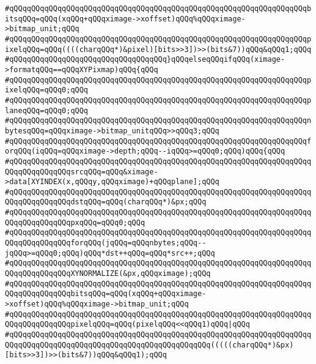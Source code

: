 \verb|#qQQqqQQqqQQqqQQqqQQqqQQqqQQqqQQqqQQqqQQqqQQqqQQqqQQqqQQqqQQqqQQqqQQqbitsqQQq=qQQq(xqQQq+qQQqximage->xoffset)qQQq%qQQqximage->bitmap_unit;qQQq|\newline
\verb|#qQQqqQQqqQQqqQQqqQQqqQQqqQQqqQQqqQQqqQQqqQQqqQQqqQQqqQQqqQQqqQQqqQQqpixelqQQq=qQQq((((charqQQq*)&pixel)[bits>>3])>>(bits&7))qQQq&qQQq1;qQQq|\newline
\verb|#qQQqqQQqqQQqqQQqqQQqqQQqqQQqqQQqqQQq}qQQqelseqQQqifqQQq(ximage->formatqQQq==qQQqXYPixmap)qQQq{qQQq|\newline
\verb|#qQQqqQQqqQQqqQQqqQQqqQQqqQQqqQQqqQQqqQQqqQQqqQQqqQQqqQQqqQQqqQQqqQQqpixelqQQq=qQQq0;qQQq|\newline
\verb|#qQQqqQQqqQQqqQQqqQQqqQQqqQQqqQQqqQQqqQQqqQQqqQQqqQQqqQQqqQQqqQQqqQQqplaneqQQq=qQQq0;qQQq|\newline
\verb|#qQQqqQQqqQQqqQQqqQQqqQQqqQQqqQQqqQQqqQQqqQQqqQQqqQQqqQQqqQQqqQQqqQQqnbytesqQQq=qQQqximage->bitmap_unitqQQq>>qQQq3;qQQq|\newline
\verb|#qQQqqQQqqQQqqQQqqQQqqQQqqQQqqQQqqQQqqQQqqQQqqQQqqQQqqQQqqQQqqQQqqQQqforqQQq(iqQQq=qQQqximage->depth;qQQq--iqQQq>=qQQq0;qQQq)qQQq{qQQq|\newline
\verb|#qQQqqQQqqQQqqQQqqQQqqQQqqQQqqQQqqQQqqQQqqQQqqQQqqQQqqQQqqQQqqQQqqQQqqQQqqQQqqQQqqQQqsrcqQQq=qQQq&ximage->data[XYINDEX(x,qQQqy,qQQqximage)+qQQqplane];qQQq|\newline
\verb|#qQQqqQQqqQQqqQQqqQQqqQQqqQQqqQQqqQQqqQQqqQQqqQQqqQQqqQQqqQQqqQQqqQQqqQQqqQQqqQQqqQQqdstqQQq=qQQq(charqQQq*)&px;qQQq|\newline
\verb|#qQQqqQQqqQQqqQQqqQQqqQQqqQQqqQQqqQQqqQQqqQQqqQQqqQQqqQQqqQQqqQQqqQQqqQQqqQQqqQQqqQQqpxqQQq=qQQq0;qQQq|\newline
\verb|#qQQqqQQqqQQqqQQqqQQqqQQqqQQqqQQqqQQqqQQqqQQqqQQqqQQqqQQqqQQqqQQqqQQqqQQqqQQqqQQqqQQqforqQQq(jqQQq=qQQqnbytes;qQQq--jqQQq>=qQQq0;qQQq)qQQq*dst++qQQq=qQQq*src++;qQQq|\newline
\verb|#qQQqqQQqqQQqqQQqqQQqqQQqqQQqqQQqqQQqqQQqqQQqqQQqqQQqqQQqqQQqqQQqqQQqqQQqqQQqqQQqqQQqXYNORMALIZE(&px,qQQqximage);qQQq|\newline
\verb|#qQQqqQQqqQQqqQQqqQQqqQQqqQQqqQQqqQQqqQQqqQQqqQQqqQQqqQQqqQQqqQQqqQQqqQQqqQQqqQQqqQQqbitsqQQq=qQQq(xqQQq+qQQqximage->xoffset)qQQq%qQQqximage->bitmap_unit;qQQq|\newline
\verb|#qQQqqQQqqQQqqQQqqQQqqQQqqQQqqQQqqQQqqQQqqQQqqQQqqQQqqQQqqQQqqQQqqQQqqQQqqQQqqQQqqQQqpixelqQQq=qQQq(pixelqQQq<<qQQq1)qQQq|\verb#|qQQq#\newline
\verb|#qQQqqQQqqQQqqQQqqQQqqQQqqQQqqQQqqQQqqQQqqQQqqQQqqQQqqQQqqQQqqQQqqQQqqQQqqQQqqQQqqQQqqQQqqQQqqQQqqQQqqQQqqQQqqQQqqQQq(((((charqQQq*)&px)[bits>>3])>>(bits&7))qQQq&qQQq1);qQQq|\newline
